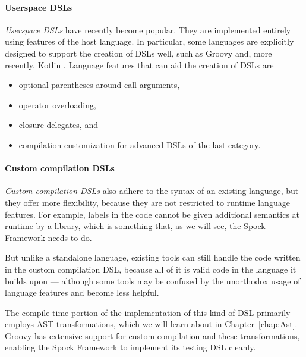 \paragraph{Userspace DSLs}
\textit{Userspace DSLs} have recently become popular.
They are implemented entirely using features of the host language.
In particular, some languages are explicitly designed to
support the creation of DSLs well, such as
Groovy \autocite[Chapter 3.15: Domain-Specific Languages]{GroovyDoc}
and, more recently,
Kotlin \autocite[Chapter: Type-Safe Builders]{KotlinDoc}.
Language features that can aid the creation of DSLs are
\autocite[Chapter 3.15: Domain-Specific Languages]{GroovyDoc}
\begin{itemize}
  \item optional parentheses around call arguments,
  \item operator overloading,
  \item closure delegates, and
  \item compilation customization for advanced DSLs of the last category.
\end{itemize}

\paragraph{Custom compilation DSLs}
\textit{Custom compilation DSLs} also adhere to the syntax of an existing language,
but they offer more flexibility, because they are not restricted to runtime language features.
For example, labels in the code cannot be given additional semantics at runtime by a library,
which is something that, as we will see, the Spock Framework needs to do.

But unlike a standalone language,
existing tools can still handle the code written in the custom compilation DSL,
because all of it is valid code in the language it builds upon ---
although some tools may be confused by the
unorthodox usage of language features and become less helpful.

The compile-time portion of the implementation of this kind of DSL
primarily employs AST transformations,
which we will learn about in Chapter~\ref{chap:Ast}.
Groovy has extensive support for custom compilation and these transformations,
\autocite[Chapter 3.15.6: Compilation customizers]{GroovyDoc}
enabling the Spock Framework to implement its testing DSL cleanly.
